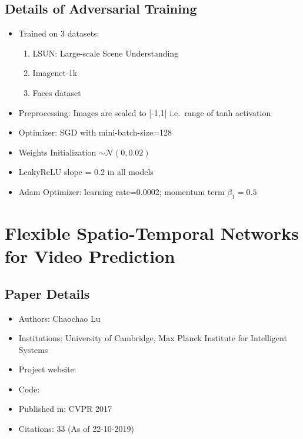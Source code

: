 \documentclass{article}
\begin{document}
    \subsection{Details of Adversarial Training}\label{subsec:Unsupervised_Representation_Learning_with_Deep_Convolutional_Generative_Adversarial_Networks_(DC_GAN):details-of-adversarial-training}
    \begin{itemize}
        \item Trained on 3 datasets:
        \begin{enumerate}
            \item LSUN: Large-scale Scene Understanding
            \item Imagenet-1k
            \item Faces dataset
        \end{enumerate}
        \item Preprocessing: Images are scaled to [-1,1] i.e.\ range of tanh activation
        \item Optimizer: SGD with mini-batch-size=128
        \item Weights Initialization $\sim \mathcal{N}(0,0.02)$
        \item LeakyReLU slope = 0.2 in all models
        \item Adam Optimizer: learning rate=0.0002;
        momentum term $\beta_1=0.5$
    \end{itemize}


    \newpage


    \section{Flexible Spatio-Temporal Networks for Video Prediction}\label{sec:Flexible_Spatio_Temporal_Networks_for_Video_Prediction}
    \subsection*{Paper Details}
    \begin{itemize}
        \item Authors: Chaochao Lu
        \item Institutions: University of Cambridge, Max Planck Institute for Intelligent Systems
        \item Project website:
        \item Code:
        \item Published in: CVPR 2017
        \item Citations: 33 (As of 22-10-2019)
    \end{itemize}
\end{document}
